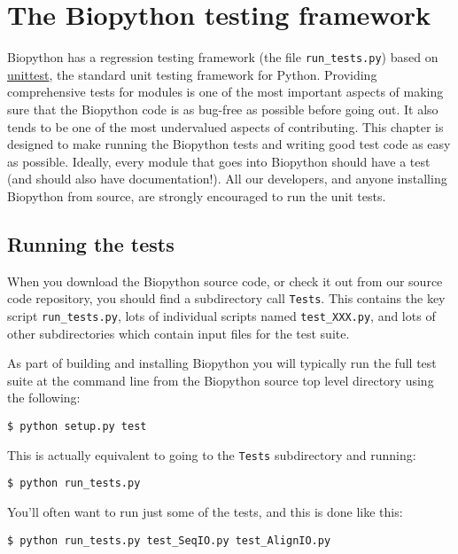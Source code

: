 \chapter{The Biopython testing framework}
\label{sec:regr_test}

Biopython has a regression testing framework (the file
\verb|run_tests.py|) based on
\href{https://docs.python.org/3/library/unittest.html}{unittest},
the standard unit testing framework for Python.  Providing comprehensive
tests for modules is one of the most important aspects of making sure that
the Biopython code is as bug-free as possible before going out.
It also tends to be one of the most undervalued aspects of contributing.
This chapter is designed to make running the Biopython tests and
writing good test code as easy as possible.
Ideally, every module that goes into Biopython
should have a test (and should also have documentation!).
All our developers, and anyone installing Biopython from source,
are strongly encouraged to run the unit tests.

\section{Running the tests}

When you download the Biopython source code, or check it out from
our source code repository, you should find a subdirectory call
\verb|Tests|.  This contains the key script \verb|run_tests.py|,
lots of individual scripts named \verb|test_XXX.py|, and lots of
other subdirectories which contain input files for the test suite.

As part of building and installing Biopython you will typically
run the full test suite at the command line from the Biopython
source top level directory using the following:

\begin{verbatim}
$ python setup.py test
\end{verbatim}

This is actually equivalent to going to the \verb|Tests|
subdirectory and running:

\begin{verbatim}
$ python run_tests.py
\end{verbatim}

You'll often want to run just some of the tests, and this is done
like this:

\begin{verbatim}
$ python run_tests.py test_SeqIO.py test_AlignIO.py
\end{verbatim}

